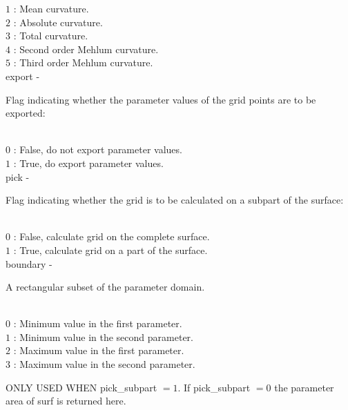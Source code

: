         \>\>\>\> $1$  \> : Mean curvature.\\
        \>\>\>\> $2$  \> : Absolute curvature.\\
        \>\>\>\> $3$  \> : Total curvature.\\
        \>\>\>\> $4$  \> : Second order Mehlum curvature.\\
        \>\>\>\> $5$  \> : Third order Mehlum curvature.\\
        \>\>    {\fov export}\> - \>  \begin{minipg2}
                     Flag indicating whether the parameter values
                            of the grid points are to be exported:
                               \end{minipg2}\\[0.8ex]
        \>\>\>\> $0$  \> : False, do not export parameter values.\\
        \>\>\>\> $1$  \> : True, do export parameter values.\\
        \>\>    {\fov pick}\> - \>  \begin{minipg2}
                     Flag indicating whether the grid is to be
                            calculated on a subpart of the surface:
                               \end{minipg2}\\[0.8ex]
        \>\>\>\> $0$  \> : False, calculate grid on the complete surface.\\
        \>\>\>\> $1$  \> : True, calculate grid on a part of the surface.\\
        \>\>    {\fov boundary}\> - \>  \begin{minipg2}
                     A rectangular subset of the parameter domain.
                               \end{minipg2}\\[0.8ex]
        \>\>\>\> $0$  \> : Minimum value in the first parameter.\\
        \>\>\>\> $1$  \> : Minimum value in the second parameter.\\
        \>\>\>\> $2$  \> : Maximum value in the first parameter.\\
        \>\>\>\> $3$  \> : Maximum value in the second parameter.\\
        \>\>\>\> \begin{minipg2}
                            ONLY USED WHEN {\fov pick\_subpart} $= 1$.
                            If {\fov pick\_subpart} $= 0$
                            the parameter area of surf is returned here.
                               \end{minipg2}\\[0.8ex]
